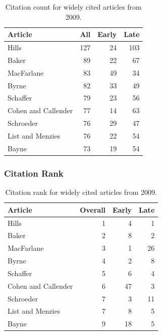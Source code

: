 \documentclass[
  10pt,
  letterpaper,
  DIV=11,
  numbers=noendperiod,
  twoside]{scrartcl}
\begin{document}
\begin{longtable}[]{@{}lrrr@{}}

\caption{\label{tbl-citation-count-2009}Citation count for widely cited
articles from 2009.}

\tabularnewline

\toprule\noalign{}
Article & All & Early & Late \\
\midrule\noalign{}
\endhead
\bottomrule\noalign{}
\endlastfoot
Hills & 127 & 24 & 103 \\
Baker & 89 & 22 & 67 \\
MacFarlane & 83 & 49 & 34 \\
Byrne & 82 & 33 & 49 \\
Schaffer & 79 & 23 & 56 \\
Cohen and Callender & 77 & 14 & 63 \\
Schroeder & 76 & 29 & 47 \\
List and Menzies & 76 & 22 & 54 \\
Bayne & 73 & 19 & 54 \\

\end{longtable}

\subsubsection*{Citation Rank}\label{sec-rank-2009}

\begin{longtable}[]{@{}lrrr@{}}

\caption{\label{tbl-citation-rank-2009}Citation rank for widely cited
articles from 2009.}

\tabularnewline

\toprule\noalign{}
Article & Overall & Early & Late \\
\midrule\noalign{}
\endhead
\bottomrule\noalign{}
\endlastfoot
Hills & 1 & 4 & 1 \\
Baker & 2 & 8 & 2 \\
MacFarlane & 3 & 1 & 26 \\
Byrne & 4 & 2 & 8 \\
Schaffer & 5 & 6 & 4 \\
Cohen and Callender & 6 & 47 & 3 \\
Schroeder & 7 & 3 & 11 \\
List and Menzies & 7 & 8 & 5 \\
Bayne & 9 & 18 & 5 \\

\end{longtable}
\end{document}
